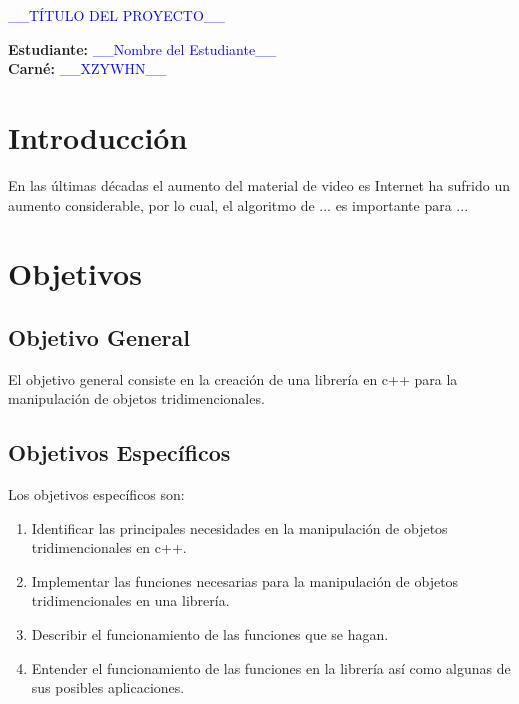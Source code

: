 \documentclass[letterpaper]{article}
\newcommand{\uic}{blue} %
\newcommand{\uim}{\_\_} %
\newcommand{\userinput}[1]{\textcolor{\uic}{\uim#1\uim}}
\begin{document}
\vspace*{2cm}

\begin{center}
\Huge
\userinput{TÍTULO DEL PROYECTO}
\vspace*{1cm}
\end{center}

\noindent
\small\baselineskip=14pt
\textbf{Estudiante:} \userinput{Nombre del Estudiante}\\
\textbf{Carné:} \userinput{XZYWHN}\\

\section{Introducción}

En las últimas décadas el aumento del material de video es Internet ha sufrido un aumento considerable, por lo cual, el algoritmo de ... es importante para ... 

\section{Objetivos}

\subsection{Objetivo General}

El objetivo general consiste en la creación de una librería en c++ para la manipulación de objetos tridimencionales.\\

\subsection{Objetivos Específicos}

Los objetivos específicos son:\\

\begin{enumerate}
\item Identificar las principales necesidades en la manipulación de objetos tridimencionales en c++.
\item Implementar las funciones necesarias para la manipulaci\'on de objetos tridimencionales en una librer\'ia.
\item Describir el funcionamiento de las funciones que se hagan.
\item Entender el funcionamiento de las funciones en la librer\'ia as\'i como algunas de sus posibles aplicaciones.
\end{enumerate}
\end{document}
